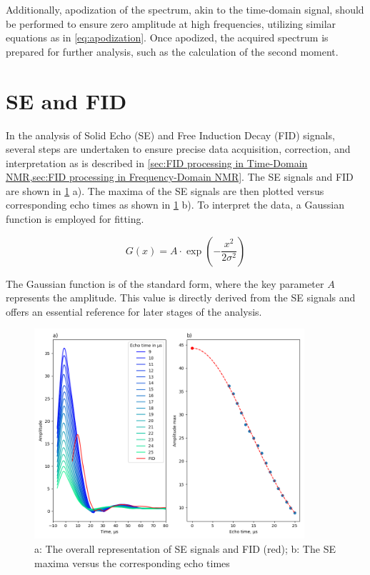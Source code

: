 \documentclass[a4paper,12pt]{article}
\begin{document}
Additionally, apodization of the spectrum, akin to the time-domain signal, should be performed to ensure zero amplitude at high frequencies, utilizing similar equations as in \cref{eq:apodization}. 
Once apodized, the acquired spectrum is prepared for further analysis, such as the calculation of the second moment.

\section{SE and FID}\label{sec:SE and FID}

In the analysis of Solid Echo (SE) and Free Induction Decay (FID) signals, several steps are undertaken to ensure precise data acquisition, correction, and interpretation as is described in \cref{sec:FID processing in Time-Domain NMR,sec:FID processing in Frequency-Domain NMR}.
The SE signals and FID are shown in \cref{fig:FID_SE} a).
The maxima of the SE signals are then plotted versus corresponding echo times as shown in \cref{fig:FID_SE} b).
To interpret the data, a Gaussian function is employed for fitting. 

\begin{equation}
  \label{eq:gaussian}
  G(x) = A \cdot \exp\left(-\frac{x^2}{2\sigma^2}\right)
\end{equation}

The Gaussian function is of the standard form, where the key parameter $A$ represents the amplitude. 
This value is directly derived from the SE signals and offers an essential reference for later stages of the analysis.

\begin{figure}[H]
  \centering
  \includegraphics[width=10cm]{images/FID_SE.png}
  \caption{a: The overall representation of SE signals and FID (red); b: The SE maxima versus the corresponding echo times}
  \label{fig:FID_SE}
\end{figure}
\end{document}
